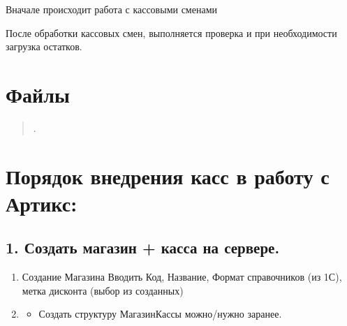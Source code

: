 \documentclass[a4paper,10pt,russian]{report}
\begin{document}
\sphinxAtStartPar
Вначале происходит работа с кассовыми сменами

\sphinxAtStartPar
{}

\sphinxAtStartPar
После обработки кассовых смен, выполняется проверка и при необходимости загрузка остатков.

\sphinxAtStartPar
{}

\sphinxstepscope


\chapter{Файлы}
\label{\detokenize{files:id1}}\label{\detokenize{files::doc}}\begin{quote}

\sphinxAtStartPar
{}.
\end{quote}

\sphinxstepscope


\chapter{Порядок внедрения касс в работу с Артикс:}
\label{\detokenize{kass:id1}}\label{\detokenize{kass::doc}}

\section{1. Создать магазин + касса на сервере.}
\label{\detokenize{kass:id2}}\begin{enumerate}
%
\item {} 
\sphinxAtStartPar
Создание Магазина \sphinxhyphen{} Вводить Код, Название, Формат справочников (из 1С), метка дисконта (выбор из созданных)

\item {} \begin{description}
\begin{itemize}
\item {} 
\sphinxAtStartPar
Создать структуру Магазин\sphinxhyphen{}Кассы можно/нужно заранее.

\end{itemize}

\end{description}

\end{enumerate}
\end{document}
